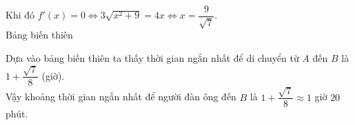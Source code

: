 \begin{ex}
{\begin{itemchoice}
			Khi đó $f'(x) = 0 \Leftrightarrow  3\sqrt{x^2 + 9} = 4x \Leftrightarrow x = \dfrac{9}{\sqrt{7}}$.\\
			Bảng  biến thiên
			\begin{center}
			\end{center}
			Dựa vào bảng biến thiên ta thấy thời gian ngắn nhất để di chuyển từ  $A$ đến $B$ là $1 + \dfrac{\sqrt{7}}{8}$ (giờ).\\
			Vậy khoảng thời gian ngắn nhất để người đàn  ông đến $B$ là $1 + \dfrac{\sqrt{7}}{8} \approx 1$ giờ $20$ phút.
		\end{itemchoice}
	 }
\end{ex}

